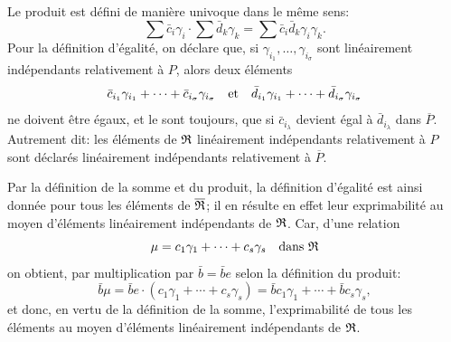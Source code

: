 Le produit est défini de manière univoque dans le même sens:
\[
   \sum \bar c_i\gamma_i\cdot \sum \bar d_k\gamma_k
   =\sum \bar c_i\bar d_k\gamma_i\gamma_k .
\]
Pour la définition d'égalité, on déclare que, si $\gamma_{i_1},\ldots,\gamma_{i_\sigma}$ sont linéairement indépendants relativement à $P$, alors deux éléments
\[
   \bar c_{i_1}\gamma_{i_1}+\cdots+\bar c_{i_\sigma}\gamma_{i_\sigma}
   \quad\hbox{et}\quad
   \bar d_{i_1}\gamma_{i_1}+\cdots+\bar d_{i_\sigma}\gamma_{i_\sigma}
\]
ne doivent être égaux, et le sont toujours, que si $\bar c_{i_\lambda}$ devient égal à $\bar d_{i_\lambda}$ dans $\overline P$. Autrement dit: les éléments de $\mathfrak R$ linéairement indépendants relativement à $P$ sont déclarés linéairement indépendants relativement à $\overline P$.

Par la définition de la somme et du produit, la définition d'égalité est ainsi donnée pour tous les éléments de $\overline{\mathfrak R}$; il en résulte en effet leur exprimabilité au moyen d'éléments linéairement indépendants de $\mathfrak R$. Car, d'une relation
\[
   \mu=c_1\gamma_1+\cdots+c_s\gamma_s\quad\hbox{dans }\mathfrak R
\]
on obtient, par multiplication par $\bar b=\bar b e$ selon la définition du produit:
\[
   \bar b\mu=\bar b e\cdot(c_1\gamma_1+\cdots+c_s\gamma_s)
      =\bar b c_1\gamma_1+\cdots+\bar b c_s\gamma_s,
\]
et donc, en vertu de la définition de la somme, l'exprimabilité de tous les éléments au moyen d'éléments linéairement indépendants de $\mathfrak R$.

